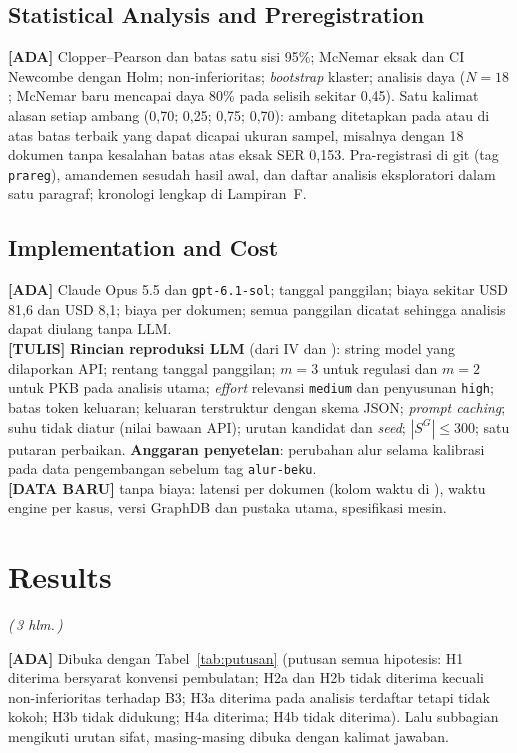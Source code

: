 \documentclass{ieeeaccess}
\newcommand{\ADA}{\textcolor{stada}{\textbf{[ADA]}}}
\newcommand{\TULIS}{\textcolor{sttulis}{\textbf{[TULIS]}}}
\newcommand{\BARU}{\textcolor{stbaru}{\textbf{[DATA BARU]}}}
\newcommand{\hal}[1]{\textcolor{draftblue}{\textit{(\,#1 hlm.\,)}}}
\newenvironment{isi}{\par\smallskip\footnotesize\color{draftblue}\noindent}{\par\smallskip\normalsize\color{black}}
\begin{document}
\subsection{Statistical Analysis and Preregistration}
\begin{isi}
\ADA{} Clopper--Pearson dan batas satu sisi 95\%; McNemar eksak dan CI Newcombe dengan Holm; non-inferioritas; \textit{bootstrap} klaster; analisis daya ($N = 18$; McNemar baru mencapai daya 80\% pada selisih sekitar 0,45). Satu kalimat alasan setiap ambang (0,70; 0,25; 0,75; 0,70): ambang ditetapkan pada atau di atas batas terbaik yang dapat dicapai ukuran sampel, misalnya dengan 18 dokumen tanpa kesalahan batas atas eksak SER 0,153. Pra-registrasi di git (tag \texttt{prareg}), amandemen sesudah hasil awal, dan daftar analisis eksploratori dalam satu paragraf; kronologi lengkap di Lampiran~F.
\end{isi}

\subsection{Implementation and Cost}
\begin{isi}
\ADA{} Claude Opus 5.5 dan \texttt{gpt-6.1-sol}; tanggal panggilan; biaya sekitar USD 81,6 dan USD 8,1; biaya per dokumen; semua panggilan dicatat sehingga analisis dapat diulang tanpa LLM.\\
\TULIS{} \textbf{Rincian reproduksi LLM} (dari  IV dan ): string model yang dilaporkan API; rentang tanggal panggilan; $m = 3$ untuk regulasi dan $m = 2$ untuk PKB pada analisis utama; \textit{effort} relevansi \texttt{medium} dan penyusunan \texttt{high}; batas token keluaran; keluaran terstruktur dengan skema JSON; \textit{prompt caching}; suhu tidak diatur (nilai bawaan API); urutan kandidat dan \textit{seed}; $|S^G| \le 300$; satu putaran perbaikan. \textbf{Anggaran penyetelan}: perubahan alur selama kalibrasi pada data pengembangan sebelum tag \texttt{alur-beku}.\\
\BARU{} tanpa biaya: latensi per dokumen (kolom waktu di ), waktu engine per kasus, versi GraphDB dan pustaka utama, spesifikasi mesin.
\end{isi}

\section{Results}
\label{sec:hasil}
\hal{3}
\begin{isi}
\ADA{} Dibuka dengan Tabel~\ref{tab:putusan} (putusan semua hipotesis: H1 diterima bersyarat konvensi pembulatan; H2a dan H2b tidak diterima kecuali non-inferioritas terhadap B3; H3a diterima pada analisis terdaftar tetapi tidak kokoh; H3b tidak didukung; H4a diterima; H4b tidak diterima). Lalu subbagian mengikuti urutan sifat, masing-masing dibuka dengan kalimat jawaban.
\end{isi}
\end{document}
